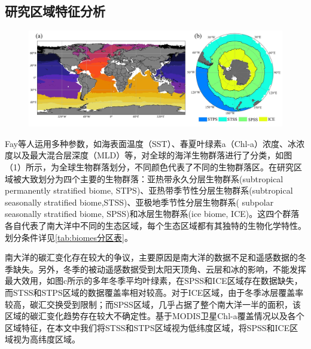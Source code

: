 \subsection{研究区域特征分析}
\begin{figure}[htbp]
    \centering
    \includegraphics[width=\linewidth]{figure/第二章用图/图2.2-生物分区.jpg}
\end{figure}

Fay等人\cite{fay2014global}运用多种参数，如海表面温度（SST）、春夏叶绿素a（Chl-a）浓度、冰浓度以及最大混合层深度（MLD）等，对全球的海洋生物群落进行了分类，如图（1）所示，为全球生物群落划分，不同颜色代表了不同的生物群落区。在研究区域被大致划分为四个主要的生物群落：亚热带永久分层生物群系(subtropical permanently stratified biome, STPS)、亚热带季节性分层生物群系(subtropical seasonally stratified biome,STSS)、亚极地季节性分层生物群系( subpolar seasonally stratified biome, SPSS)和冰层生物群系(ice biome, ICE)。这四个群落各自代表了南大洋中不同的生态区域，每个生态区域都有其独特的生物化学特性。划分条件详见\autoref{tab:biomes分区表}。

南大洋的碳汇变化存在较大的争议，主要原因是南大洋的数据不足和遥感数据的冬季缺失。另外，冬季的被动遥感数据受到太阳天顶角、云层和冰的影响，不能发挥最大效用，如图c所示的多年冬季平均叶绿素，在SPSS和ICE区域存在数据缺失，而STSS和STPS区域的数据覆盖率相对较高。对于ICE区域，由于冬季冰层覆盖率较高，碳汇交换受到限制；而SPSS区域，几乎占据了整个南大洋一半的面积，该区域的碳汇变化趋势存在较大不确定性。基于MODIS卫星Chl-a覆盖情况以及各个区域特征，在本文中我们将STSS和STPS区域视为低纬度区域，将SPSS和ICE区域视为高纬度区域。

